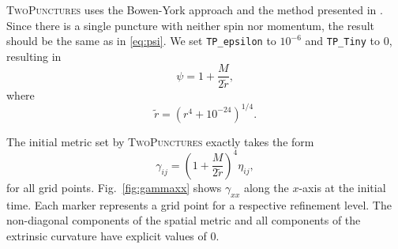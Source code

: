 \documentclass[%
 reprint,
 amsmath,amssymb,
 aps,
 prd,
]{revtex4-2}
\begin{document}
%
%
%

\textsc{TwoPunctures} \cite{Ansorg:2004ds} uses the Bowen-York approach \cite{Bowen:1980yu} and the method presented in \cite{PhysRevD.77.024027}. Since there is a single puncture with neither spin nor momentum, the result should be the same as in \eqref{eq:psi}. We set \texttt{TP_epsilon} to $10^{-6}$ and \texttt{TP_Tiny} to $0$, resulting in
\begin{equation}
	\psi = 1 + \frac{M}{2\tilde{r}},
\end{equation}
where
\begin{equation}
	\tilde{r} = \left(r^4 + 10^{-24}\right)^{1/4}.
\end{equation}

The initial metric set by \textsc{TwoPunctures} exactly takes the form
\begin{equation}
	\gamma_{ij} = \left(1 + \frac{M}{2\tilde{r}}\right)^4\eta_{ij},
\end{equation}
for all grid points. Fig.~\ref{fig:gammaxx} shows $\gamma_{xx}$ along the $x$-axis at the initial time. Each marker represents a grid point for a respective refinement level. The non-diagonal components of the spatial metric and all components of the extrinsic curvature have explicit values of 0.
\end{document}
